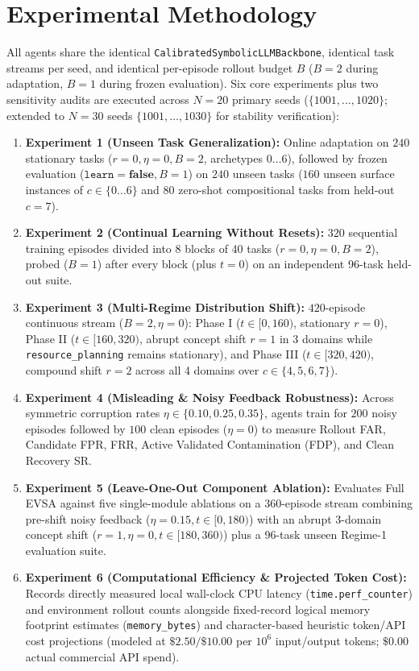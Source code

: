 \documentclass[10pt,letterpaper]{article}
\begin{document}
\section{Experimental Methodology}
All agents share the identical \texttt{CalibratedSymbolicLLMBackbone}, identical task streams per seed, and identical per-episode rollout budget $B$ ($B=2$ during adaptation, $B=1$ during frozen evaluation). Six core experiments plus two sensitivity audits are executed across $N=20$ primary seeds ($\{1001, \dots, 1020\}$; extended to $N=30$ seeds $\{1001, \dots, 1030\}$ for stability verification):
\begin{enumerate}
  \item \textbf{Experiment 1 (Unseen Task Generalization):} Online adaptation on $240$ stationary tasks ($r=0, \eta=0, B=2$, archetypes $0\dots 6$), followed by frozen evaluation ($\texttt{learn}=\textbf{false}, B=1$) on $240$ unseen tasks ($160$ unseen surface instances of $c \in \{0\dots 6\}$ and $80$ zero-shot compositional tasks from held-out $c=7$).
  \item \textbf{Experiment 2 (Continual Learning Without Resets):} $320$ sequential training episodes divided into 8 blocks of 40 tasks ($r=0, \eta=0, B=2$), probed ($B=1$) after every block (plus $t=0$) on an independent 96-task held-out suite.
  \item \textbf{Experiment 3 (Multi-Regime Distribution Shift):} $420$-episode continuous stream ($B=2, \eta=0$): Phase I ($t \in [0,160)$, stationary $r=0$), Phase II ($t \in [160,320)$, abrupt concept shift $r=1$ in 3 domains while \texttt{resource\_planning} remains stationary), and Phase III ($t \in [320,420)$, compound shift $r=2$ across all 4 domains over $c \in \{4,5,6,7\}$).
  \item \textbf{Experiment 4 (Misleading \& Noisy Feedback Robustness):} Across symmetric corruption rates $\eta \in \{0.10, 0.25, 0.35\}$, agents train for $200$ noisy episodes followed by $100$ clean episodes ($\eta=0$) to measure Rollout FAR, Candidate FPR, FRR, Active Validated Contamination (FDP), and Clean Recovery SR.
  \item \textbf{Experiment 5 (Leave-One-Out Component Ablation):} Evaluates Full EVSA against five single-module ablations on a $360$-episode stream combining pre-shift noisy feedback ($\eta=0.15, t \in [0,180)$) with an abrupt 3-domain concept shift ($r=1, \eta=0, t \in [180,360)$) plus a 96-task unseen Regime-1 evaluation suite.
  \item \textbf{Experiment 6 (Computational Efficiency \& Projected Token Cost):} Records directly measured local wall-clock CPU latency (\texttt{time.perf\_counter}) and environment rollout counts alongside fixed-record logical memory footprint estimates (\texttt{memory\_bytes}) and character-based heuristic token/API cost projections (modeled at $\$2.50 / \$10.00$ per $10^6$ input/output tokens; $\$0.00$ actual commercial API spend).
\end{enumerate}
\end{document}
